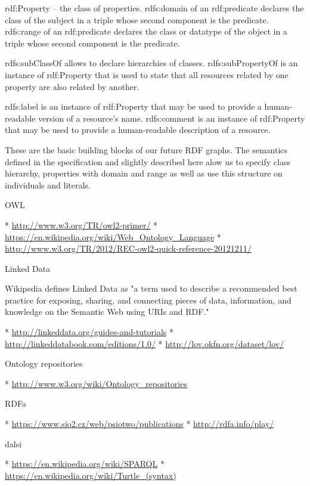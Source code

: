     rdf:Property – the class of properties.
    rdfs:domain of an rdf:predicate declares the class of the subject in a triple whose second component is the predicate.
    rdfs:range of an rdf:predicate declares the class or datatype of the object in a triple whose second component is the predicate.

    rdfs:subClassOf allows to declare hierarchies of classes.
    rdfs:subPropertyOf is an instance of rdf:Property that is used to state that all resources related by one property are also related by another.

    rdfs:label is an instance of rdf:Property that may be used to provide a human-readable version of a resource's name.
    rdfs:comment is an instance of rdf:Property that may be used to provide a human-readable description of a resource.

These are the basic building blocks of our future RDF graphs. The semantics
defined in the specification and slightly described here alow us to specify
class hierarchy, properties with domain and range as well as use this structure
on individuals and literals.  

\sec OWL

\begitems
 * \url{http://www.w3.org/TR/owl2-primer/}
 * \url{https://en.wikipedia.org/wiki/Web_Ontology_Language}
 * \url{http://www.w3.org/TR/2012/REC-owl2-quick-reference-20121211/}
\enditems


\sec Linked Data

Wikipedia defines Linked Data as "a term used to describe a recommended best
practice for exposing, sharing, and connecting pieces of data, information, and
knowledge on the Semantic Web using URIs and RDF."

\begitems
 * \url{http://linkeddata.org/guides-and-tutorials}
 * \url{http://linkeddatabook.com/editions/1.0/}
 * \url{http://lov.okfn.org/dataset/lov/}
\enditems


\sec Ontology repositories

\begitems
 * \url{http://www.w3.org/wiki/Ontology_repositories}
\enditems


\sec RDFa

\begitems
 * \url{https://www.sio2.cz/web/psiotwo/publications}
 * \url{http://rdfa.info/play/}
\enditems


\sec dalsi

\begitems
 * \url{https://en.wikipedia.org/wiki/SPARQL}
 * \url{https://en.wikipedia.org/wiki/Turtle_(syntax)}
\enditems



